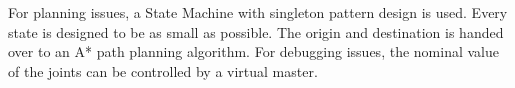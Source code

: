 For planning issues, a State Machine with singleton pattern design is used. Every state is designed
to be as small as possible. The origin and destination is handed over to an A* path planning
algorithm. For debugging issues, the nominal value of the joints can be controlled by a virtual
master.